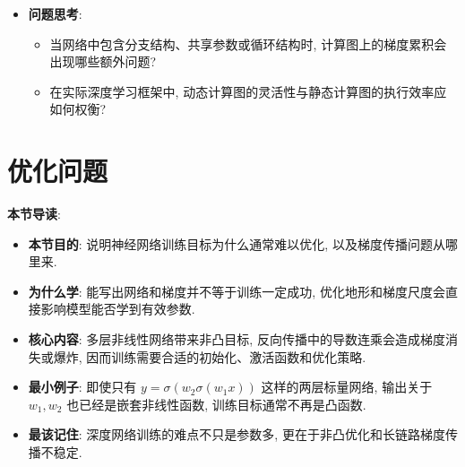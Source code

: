 \documentclass{../nndlcourse}
\begin{document}
\begin{itemize}
\begin{itemize}
        \item 动态计算图在程序执行过程中即时构建, 更便于调试, 也更适合处理不同输入对应不同网络结构的情形. PyTorch 是典型代表. 
        \item 二者各有取舍: 静态图通常更容易做全局优化, 动态图通常具有更高的表达灵活性. 
    \end{itemize}
    \item \textbf{问题思考}:
    \begin{itemize}
        \item 当网络中包含分支结构、共享参数或循环结构时, 计算图上的梯度累积会出现哪些额外问题? 
        \item 在实际深度学习框架中, 动态计算图的灵活性与静态计算图的执行效率应如何权衡? 
    \end{itemize}
\end{itemize}

\section{优化问题}

\textbf{本节导读}:
\begin{itemize}
    \item \textbf{本节目的}: 说明神经网络训练目标为什么通常难以优化, 以及梯度传播问题从哪里来.
    \item \textbf{为什么学}: 能写出网络和梯度并不等于训练一定成功, 优化地形和梯度尺度会直接影响模型能否学到有效参数.
    \item \textbf{核心内容}: 多层非线性网络带来非凸目标, 反向传播中的导数连乘会造成梯度消失或爆炸, 因而训练需要合适的初始化、激活函数和优化策略.
    \item \textbf{最小例子}: 即使只有 $y=\sigma(w_2\sigma(w_1x))$ 这样的两层标量网络, 输出关于 $w_1,w_2$ 也已经是嵌套非线性函数, 训练目标通常不再是凸函数.
    \item \textbf{最该记住}: 深度网络训练的难点不只是参数多, 更在于非凸优化和长链路梯度传播不稳定.
\end{itemize}
\end{document}
